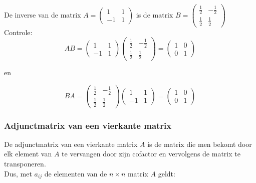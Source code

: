 \begin{voorbeeld}
	De inverse van de matrix $A=\left( \begin{matrix} 1 & 1 \\ -1 & 1 \end{matrix} \right)$ is de matrix $B=\left( \begin{matrix} \frac{1}{2} & -\frac{1}{2} \\ \frac{1}{2} & \frac{1}{2} \end{matrix} \right)$ \\
Controle:\\
\[ AB=\left( \begin{matrix} 1 & 1 \\ -1 & 1 \end{matrix} \right) \left( \begin{matrix} \frac{1}{2} & -\frac{1}{2} \\ \frac{1}{2} & \frac{1}{2} \end{matrix} \right)= \left( \begin{matrix} 1 & 0 \\ 0 & 1 \end{matrix} \right)    \]

en

\[ BA=\left( \begin{matrix} \frac{1}{2} & -\frac{1}{2} \\ \frac{1}{2} & \frac{1}{2} \end{matrix} \right) \left( \begin{matrix} 1 & 1 \\ -1 & 1 \end{matrix} \right) =  \left( \begin{matrix} 1 & 0 \\ 0 & 1 \end{matrix} \right)    \]

\end{voorbeeld}

\subsubsection{Adjunctmatrix van een vierkante matrix}

De adjunctmatrix van een vierkante matrix $A$ is de matrix die men bekomt door elk element van $A$ te vervangen door zijn cofactor en vervolgens de matrix te transponeren.\\

Dus, met $a_{ij}$ de elementen van de $n \times n$ matrix $A$ geldt:


